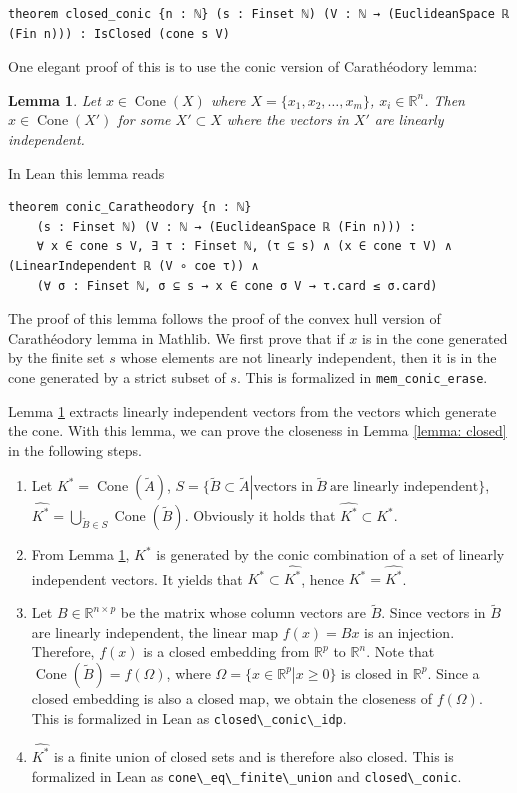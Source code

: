 \documentclass[sn-mathphys]{JORSC-jnl}%
\theoremstyle{thmstyleone}%
\newtheorem{lemma}[theorem]{Lemma}%
\theoremstyle{thmstylethree}%
\newcommand{\lean}[1]{\lstinline[language=lean, mathescape=true]{#1}}
\begin{document}
\begin{lstlisting}
theorem closed_conic {n : ℕ} (s : Finset ℕ) (V : ℕ → (EuclideanSpace ℝ (Fin n))) : IsClosed (cone s V)
\end{lstlisting}
One elegant proof of this is to use the conic version of Carathéodory lemma:
\begin{lemma}\label{lemma: Caratheodory}
    Let $x \in \operatorname{Cone}(X)$ where $X = \{x_1, x_2, \dots, x_m\}$, $x_i \in \mathbb{R}^n$. Then $x \in \operatorname{Cone}(X')$ for some $X' \subset X$ where the vectors in $X'$ are linearly independent.
\end{lemma}
In Lean this lemma reads
\begin{lstlisting}
theorem conic_Caratheodory {n : ℕ}
    (s : Finset ℕ) (V : ℕ → (EuclideanSpace ℝ (Fin n))) :
    ∀ x ∈ cone s V, ∃ τ : Finset ℕ, (τ ⊆ s) ∧ (x ∈ cone τ V) ∧ (LinearIndependent ℝ (V ∘ coe τ)) ∧
    (∀ σ : Finset ℕ, σ ⊆ s → x ∈ cone σ V → τ.card ≤ σ.card) 
\end{lstlisting}
The proof of this lemma follows the proof of the convex hull version of Carathéodory lemma in Mathlib. We first prove that if $x$ is in the cone generated by the finite set $s$ whose elements are not linearly independent, then it is in the cone generated by a strict subset of $s$. This is formalized in \lean{mem_conic_erase}.

Lemma \ref{lemma: Caratheodory} extracts linearly independent vectors from the vectors which generate the cone. With this lemma, we can prove the closeness in Lemma \ref{lemma: closed} in the following steps.
\begin{enumerate}
    \item Let $K^\ast = \operatorname{Cone}(\widetilde{A})$, $S = \{\widetilde{B} \subset \widetilde{A}\left.\right\lvert \text{vectors in}\ \widetilde{B}\ \text{are linearly independent}\}$, $\widehat{K^\ast} = \bigcup_{\widetilde{B}\in S}\operatorname{Cone}(\widetilde{B})$. Obviously it holds that $\widehat{K^\ast} \subset K^\ast$.
    \item From Lemma \ref{lemma: Caratheodory}, $K^\ast$ is generated by the conic combination of a set of linearly independent vectors. It yields that $K^\ast \subset \widehat{K^\ast}$, hence $K^\ast = \widehat{K^\ast}$.
    \item Let $B \in \mathbb{R}^{n\times p}$ be the matrix whose column vectors are $\widetilde{B}$. Since vectors in $\widetilde{B}$ are linearly independent, the linear map $f(x) = Bx$ is an injection. Therefore, $f(x)$ is a closed embedding from $\mathbb{R}^p$ to $\mathbb{R}^n$. Note that $\operatorname{Cone}(\widetilde{B}) = f(\Omega)$, where $\Omega = \{x\in \mathbb{R}^p\left.\right\lvert x\geqslant 0\}$ is closed in $\mathbb{R}^p$. Since a closed embedding is also a closed map, we obtain the closeness of $f(\Omega)$. This is formalized in Lean as \lean{closed\_conic\_idp}.
    \item $\widehat{K^\ast}$ is a finite union of closed sets and is therefore also closed. This is formalized in Lean as \lean{cone\_eq\_finite\_union} and \lean{closed\_conic}.
\end{enumerate}
\end{document}
